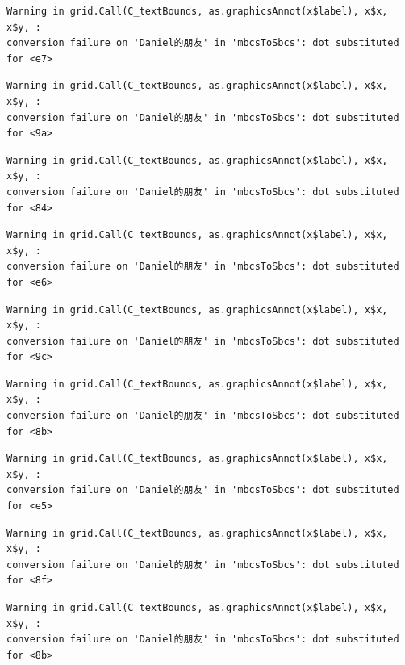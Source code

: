 \documentclass[
  letterpaper,
  DIV=11,
  numbers=noendperiod]{scrreprt}
\begin{document}
\begin{verbatim}
Warning in grid.Call(C_textBounds, as.graphicsAnnot(x$label), x$x, x$y, :
conversion failure on 'Daniel的朋友' in 'mbcsToSbcs': dot substituted for <e7>
\end{verbatim}

\begin{verbatim}
Warning in grid.Call(C_textBounds, as.graphicsAnnot(x$label), x$x, x$y, :
conversion failure on 'Daniel的朋友' in 'mbcsToSbcs': dot substituted for <9a>
\end{verbatim}

\begin{verbatim}
Warning in grid.Call(C_textBounds, as.graphicsAnnot(x$label), x$x, x$y, :
conversion failure on 'Daniel的朋友' in 'mbcsToSbcs': dot substituted for <84>
\end{verbatim}

\begin{verbatim}
Warning in grid.Call(C_textBounds, as.graphicsAnnot(x$label), x$x, x$y, :
conversion failure on 'Daniel的朋友' in 'mbcsToSbcs': dot substituted for <e6>
\end{verbatim}

\begin{verbatim}
Warning in grid.Call(C_textBounds, as.graphicsAnnot(x$label), x$x, x$y, :
conversion failure on 'Daniel的朋友' in 'mbcsToSbcs': dot substituted for <9c>
\end{verbatim}

\begin{verbatim}
Warning in grid.Call(C_textBounds, as.graphicsAnnot(x$label), x$x, x$y, :
conversion failure on 'Daniel的朋友' in 'mbcsToSbcs': dot substituted for <8b>
\end{verbatim}

\begin{verbatim}
Warning in grid.Call(C_textBounds, as.graphicsAnnot(x$label), x$x, x$y, :
conversion failure on 'Daniel的朋友' in 'mbcsToSbcs': dot substituted for <e5>
\end{verbatim}

\begin{verbatim}
Warning in grid.Call(C_textBounds, as.graphicsAnnot(x$label), x$x, x$y, :
conversion failure on 'Daniel的朋友' in 'mbcsToSbcs': dot substituted for <8f>
\end{verbatim}

\begin{verbatim}
Warning in grid.Call(C_textBounds, as.graphicsAnnot(x$label), x$x, x$y, :
conversion failure on 'Daniel的朋友' in 'mbcsToSbcs': dot substituted for <8b>
\end{verbatim}
\end{document}

